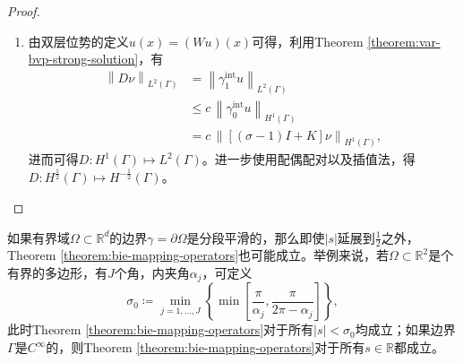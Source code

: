 \begin{proof}
\begin{enumerate}
  \item 由双层位势的定义$u(x) = \left( W u \right)(x)$可得，利用Theorem \ref{theorem:var-bvp-strong-solution}，有
  \begin{equation*}
    \begin{split}
      \left\| D \nu \right\|_{L^{2}(\Gamma)}
      & = \left\| \gamma_{1}^{\text{int}} u \right\|_{L^{2}(\Gamma)} \\
      & \le c \, \left\| \gamma_{0}^{\text{int}} u \right\|_{H^{1}(\Gamma)} \\
      & = c \, \left\|
      \left[
      \left( \sigma - 1 \right) I + K
      \right] \nu
      \right\|_{H^{1}(\Gamma)},
    \end{split}
  \end{equation*}
  进而可得$D:H^{1}(\Gamma) \mapsto L^{2}(\Gamma)$。进一步使用配偶配对以及插值法，得$D:H^{\frac{1}{2}}(\Gamma) \mapsto H^{-\frac{1}{2}}(\Gamma)$。
\end{enumerate}
\end{proof}

如果有界域$\Omega \subset \mathbb{R}^{d}$的边界$\gamma = \partial \Omega$是分段平滑的，那么即使$\left| s \right|$延展到$\frac{1}{2}$之外，Theorem \ref{theorem:bie-mapping-operators}也可能成立。举例来说，若$\Omega \subset \mathbb{R}^{2}$是个有界的多边形，有$J$个角，内夹角$\alpha_{j}$，可定义
\begin{equation*}
  \sigma_{0} \coloneqq \min_{j=1,\ldots,J}
  \left\{
  \min
  \left[
  \frac{\pi}{\alpha_{j}},
  \frac{\pi}{2 \pi - \alpha_{j}}
  \right]
  \right\},
\end{equation*}
此时Theorem \ref{theorem:bie-mapping-operators}对于所有$\left| s \right| < \sigma_{0}$均成立\citep{Costabel:1985dl}；如果边界$\Gamma$是$C^{\infty}$的，则Theorem \ref{theorem:bie-mapping-operators}对于所有$s \in \mathbb{R}$都成立。
